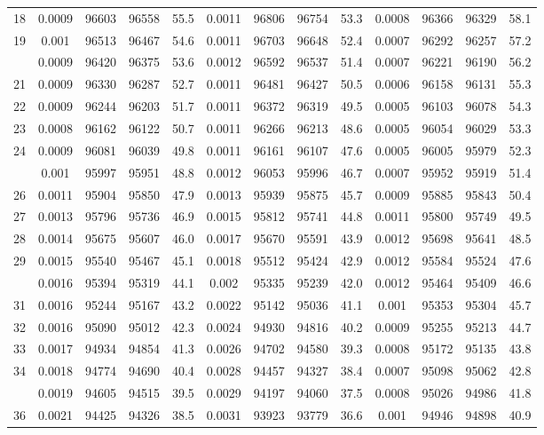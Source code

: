 \documentclass[
  14pt,
]{article}
\begin{document}
\begin{longtable}[t]{lcccccccccccc}
18 & 0.0009 & 96603 & 96558 & 55.5 & 0.0011 & 96806 & 96754 & 53.3 & 0.0008 & 96366 & 96329 & 58.1\\
19 & 0.001 & 96513 & 96467 & 54.6 & 0.0011 & 96703 & 96648 & 52.4 & 0.0007 & 96292 & 96257 & 57.2\\
\addlinespace
20 & 0.0009 & 96420 & 96375 & 53.6 & 0.0012 & 96592 & 96537 & 51.4 & 0.0007 & 96221 & 96190 & 56.2\\
21 & 0.0009 & 96330 & 96287 & 52.7 & 0.0011 & 96481 & 96427 & 50.5 & 0.0006 & 96158 & 96131 & 55.3\\
22 & 0.0009 & 96244 & 96203 & 51.7 & 0.0011 & 96372 & 96319 & 49.5 & 0.0005 & 96103 & 96078 & 54.3\\
23 & 0.0008 & 96162 & 96122 & 50.7 & 0.0011 & 96266 & 96213 & 48.6 & 0.0005 & 96054 & 96029 & 53.3\\
24 & 0.0009 & 96081 & 96039 & 49.8 & 0.0011 & 96161 & 96107 & 47.6 & 0.0005 & 96005 & 95979 & 52.3\\
\addlinespace
25 & 0.001 & 95997 & 95951 & 48.8 & 0.0012 & 96053 & 95996 & 46.7 & 0.0007 & 95952 & 95919 & 51.4\\
26 & 0.0011 & 95904 & 95850 & 47.9 & 0.0013 & 95939 & 95875 & 45.7 & 0.0009 & 95885 & 95843 & 50.4\\
27 & 0.0013 & 95796 & 95736 & 46.9 & 0.0015 & 95812 & 95741 & 44.8 & 0.0011 & 95800 & 95749 & 49.5\\
28 & 0.0014 & 95675 & 95607 & 46.0 & 0.0017 & 95670 & 95591 & 43.9 & 0.0012 & 95698 & 95641 & 48.5\\
29 & 0.0015 & 95540 & 95467 & 45.1 & 0.0018 & 95512 & 95424 & 42.9 & 0.0012 & 95584 & 95524 & 47.6\\
\addlinespace
30 & 0.0016 & 95394 & 95319 & 44.1 & 0.002 & 95335 & 95239 & 42.0 & 0.0012 & 95464 & 95409 & 46.6\\
31 & 0.0016 & 95244 & 95167 & 43.2 & 0.0022 & 95142 & 95036 & 41.1 & 0.001 & 95353 & 95304 & 45.7\\
32 & 0.0016 & 95090 & 95012 & 42.3 & 0.0024 & 94930 & 94816 & 40.2 & 0.0009 & 95255 & 95213 & 44.7\\
33 & 0.0017 & 94934 & 94854 & 41.3 & 0.0026 & 94702 & 94580 & 39.3 & 0.0008 & 95172 & 95135 & 43.8\\
34 & 0.0018 & 94774 & 94690 & 40.4 & 0.0028 & 94457 & 94327 & 38.4 & 0.0007 & 95098 & 95062 & 42.8\\
\addlinespace
35 & 0.0019 & 94605 & 94515 & 39.5 & 0.0029 & 94197 & 94060 & 37.5 & 0.0008 & 95026 & 94986 & 41.8\\
36 & 0.0021 & 94425 & 94326 & 38.5 & 0.0031 & 93923 & 93779 & 36.6 & 0.001 & 94946 & 94898 & 40.9\\

\end{longtable}
\end{document}
